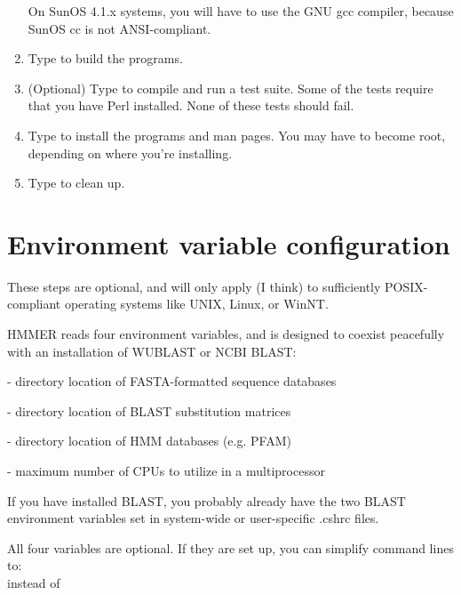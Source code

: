 \begin{enumerate}
On SunOS 4.1.x systems, you will have to use the GNU gcc compiler,
because SunOS cc is not ANSI-compliant.

\item Type  to build the programs.

\item (Optional) Type  to compile and run a test suite.
Some of the tests require that you have Perl installed. None of these
tests should fail.

\item Type  to install the programs and man pages. 
You may have to become root, depending on where you're installing.

\item Type  to clean up. 
\end{enumerate}

\section{Environment variable configuration}

These steps are optional, and will only apply (I think) to
sufficiently POSIX-compliant operating systems like UNIX, Linux, or
WinNT.

HMMER reads four environment variables, and is designed to coexist
peacefully with an installation of WUBLAST or NCBI BLAST:

\begin{wideitem}
\item[\emprog{BLASTDB}] - directory location of FASTA-formatted sequence databases
\item[\emprog{BLASTMAT}] - directory location of BLAST substitution matrices
\item[\emprog{HMMERDB}] - directory location of HMM databases (e.g. PFAM)
\item[\emprog{HMMER\_NCPU}] - maximum number of CPUs to utilize in a multiprocessor
\end{wideitem}

If you have installed BLAST, you probably already have the two BLAST
environment variables set in system-wide or user-specific .cshrc
files. 

All four variables are optional. If they are set up, you can simplify
command lines to:\\
instead of\\

